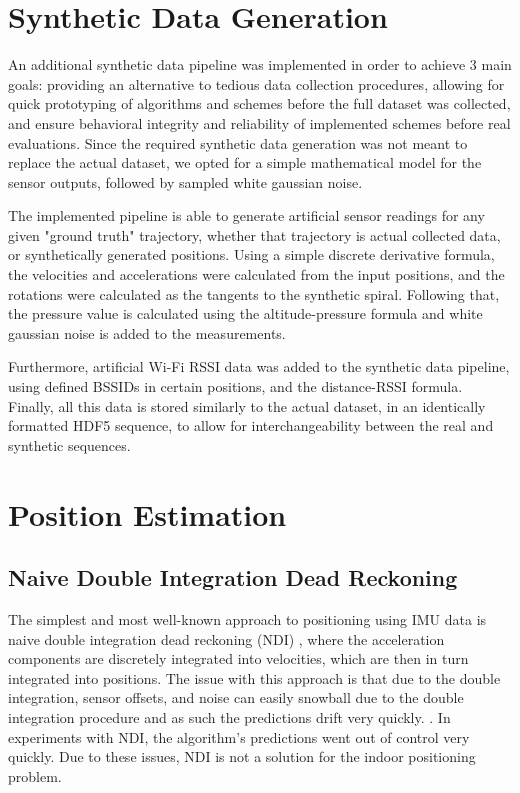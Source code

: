 \section{Synthetic Data Generation}
An additional synthetic data pipeline was implemented in order to achieve 3 main goals: providing an alternative to tedious data collection procedures, allowing for quick prototyping of algorithms and schemes before the full dataset was collected, and ensure behavioral integrity and reliability of implemented schemes before real evaluations. Since the required synthetic data generation was not meant to replace the actual dataset, we opted for a simple mathematical model for the sensor outputs, followed by sampled white gaussian noise.
\par
The implemented pipeline is able to generate artificial sensor readings for any given "ground truth" trajectory, whether that trajectory is actual collected data, or synthetically generated positions. Using a simple discrete derivative formula, the velocities and accelerations were calculated from the input positions, and the rotations were calculated as the tangents to the synthetic spiral. Following that, the pressure value is calculated using the altitude-pressure formula \cite{barometric} and white gaussian noise is added to the measurements.
\par
Furthermore, artificial Wi-Fi RSSI data was added to the synthetic data pipeline, using defined BSSIDs in certain positions, and the distance-RSSI formula. \cite{shang_2014_a} Finally, all this data is stored similarly to the actual dataset, in an identically formatted HDF5 sequence, to allow for interchangeability between the real and synthetic sequences.



\section{Position Estimation}
\subsection{Naive Double Integration Dead Reckoning}
The simplest and most well-known approach to positioning using IMU data is naive double integration dead reckoning (NDI) \cite{yan_2019_ronin}, where the acceleration components are discretely integrated into velocities, which are then in turn integrated into positions. The issue with this approach is that due to the double integration, sensor offsets, and noise can easily snowball due to the double integration procedure and as such the predictions drift very quickly. \cite{yan_2019_ronin}. In experiments with NDI, the algorithm's predictions went out of control very quickly. Due to these issues, NDI is not a solution for the indoor positioning problem.

